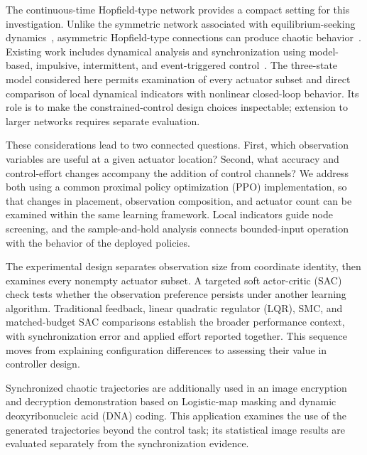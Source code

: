 \documentclass[a4paper,fleqn]{cas-dc}
\theoremstyle{plain}
\theoremstyle{definition}
\begin{document}
The continuous-time Hopfield-type network provides a compact setting for this investigation. Unlike the symmetric network associated with equilibrium-seeking dynamics~\cite{hopfield1984neurons}, asymmetric Hopfield-type connections can produce chaotic behavior~\cite{LI2013a,zheng2010double,bao2017numerical}. Existing work includes dynamical analysis and synchronization using model-based, impulsive, intermittent, and event-triggered control~\cite{mahmoud2021analysis,zhang2011weak,cao2024synchronisation,wu2023stability,dong2026event}. The three-state model considered here permits examination of every actuator subset and direct comparison of local dynamical indicators with nonlinear closed-loop behavior. Its role is to make the constrained-control design choices inspectable; extension to larger networks requires separate evaluation.

These considerations lead to two connected questions. First, which observation variables are useful at a given actuator location? Second, what accuracy and control-effort changes accompany the addition of control channels? We address both using a common proximal policy optimization (PPO) implementation, so that changes in placement, observation composition, and actuator count can be examined within the same learning framework. Local indicators guide node screening, and the sample-and-hold analysis connects bounded-input operation with the behavior of the deployed policies.

The experimental design separates observation size from coordinate identity, then examines every nonempty actuator subset. A targeted soft actor-critic (SAC) check tests whether the observation preference persists under another learning algorithm. Traditional feedback, linear quadratic regulator (LQR), SMC, and matched-budget SAC comparisons establish the broader performance context, with synchronization error and applied effort reported together. This sequence moves from explaining configuration differences to assessing their value in controller design.

Synchronized chaotic trajectories are additionally used in an image encryption and decryption demonstration based on Logistic-map masking and dynamic deoxyribonucleic acid (DNA) coding. This application examines the use of the generated trajectories beyond the control task; its statistical image results are evaluated separately from the synchronization evidence.
\end{document}
